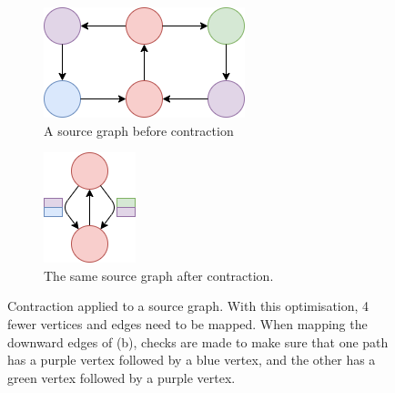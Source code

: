 \begin{figure}[ht]
\begin{subfigure}{.5\textwidth}
  \centering
\includegraphics[scale=0.8]{images/contraction/before.png}
  \caption{A source graph before contraction}
\end{subfigure}
\begin{subfigure}{.5\textwidth}
  \centering
\includegraphics[scale=0.8]{images/contraction/after.png}
  \caption{The same source graph after contraction.}
\end{subfigure}
\caption{Contraction applied to a source graph. With this optimisation, 4 fewer vertices and edges need to be mapped. When mapping the downward edges of (b), checks are made to make sure that one path has a purple vertex followed by a blue vertex, and the other has a green vertex followed by a purple vertex.}
\label{fig:contraction}
\end{figure}

